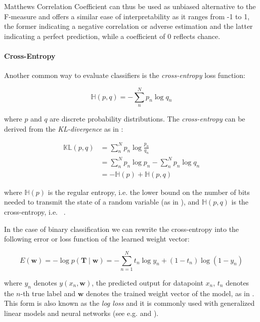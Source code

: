 Matthews Correlation Coefficient can thus be used as unbiased alternative to the F-measure and offers a similar ease of interpretability as it ranges from -1 to 1, the former indicating a negative correlation or adverse estimation and the latter  indicating a perfect prediction, while a coefficient of 0 reflects chance.

\paragraph{Cross-Entropy}
\label{par:Cross-Entropy}

Another common way to evaluate classifiers is the \emph{cross-entropy} loss function:

\begin{equation}
  \mathbb{H}(p,q) = - \sum_n^N p_n \log q_n
\end{equation}

where $p$ and $q$ are discrete probability distributions. The \emph{cross-entropy} can be derived from the \emph{KL-divergence} as in \cite[Chapter 2.8.2, p.~57]{Murphy:2012aa}:

\begin{equation}
  \begin{split}
  \mathbb{KL}(p,q) &= \sum_n^N p_n \log \frac{p_n}{q_n} \\
  &= \sum_n^N p_n \log p_n - \sum_n^N p_n \log q_n \\
  &= - \mathbb{H}(p) + \mathbb{H}(p,q)
\end{split}
\end{equation}

where $\mathbb{H}(p)$ is the regular entropy, i.e. the lower bound on the number of bits needed to transmit the state of a random variable (as in \cite{Shannon:2001aa}), and $\mathbb{H}(p,q)$ is the cross-entropy, i.e. ~\cite[Chapter 2.8.2, p.~57]{Murphy:2012aa}.

In the case of binary classification we can rewrite the cross-entropy into the following error or loss function of the learned weight vector:

\begin{equation}
  E(\mathbf{w}) =  -\log p(\mathbf{T} \mid \mathbf{w}) = - \sum_{n=1}^N {t_n \log y_n + (1 - t_n) \log (1 - y_n)}
\end{equation}

where $y_n$ denotes $y(x_n, \mathbf{w})$, the predicted output for datapoint $x_n$, $t_n$ denotes the $n$-th true label and $\mathbf{w}$ denotes the trained weight vector of the model, as in \cite[Chapter 4.3.2, p.~205 ]{Bishop:2006aa}. This form is also known as the \emph{log loss} and it is commonly used with generalized linear models and neural networks (see e.g. \cite[Chapter 4.3.2, p.~205 ]{Bishop:2006aa} and \cite[Chapter 10.7, p.~251 ]{Alpaydin:2014aa}).

